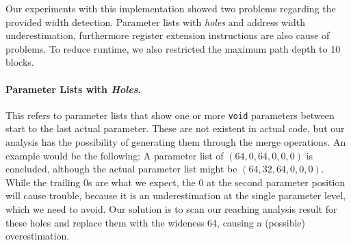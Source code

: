 %

Our experiments with this implementation showed two problems regarding the provided width detection. Parameter lists with \textit{holes} and address width underestimation, 
furthermore register extension instructions are also cause of problems. To reduce runtime, we also restricted the maximum path depth to 10 blocks.

\paragraph{Parameter Lists with \textit{Holes}.} This refers to parameter lists that show one or more \texttt{void} parameters between start to the last actual parameter. 
These are not existent in actual code, but our analysis has the possibility of generating them through the merge operations. An example would be the following: 
A parameter list of $(64, 0, 64, 0, 0, 0)$ is concluded, although the actual parameter list might be $(64, 32, 64, 0, 0, 0)$. While the trailing 0s are 
what we expect, the 0 at the second parameter position will cause trouble, because it is an underestimation at the single parameter level, which we need to avoid.
Our solution is to scan our reaching analysis result for these holes and replace them with the wideness $64$, causing a (possible) overestimation.

